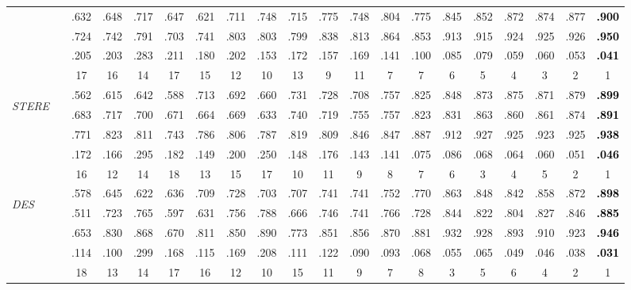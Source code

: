 \documentclass[journal]{IEEEtran}
\newcommand{\trb}[1]{\textbf{\textcolor{black}{#1}}}
\begin{document}
\begin{table*}[t!]
\begin{tabular}{lr||c|c|c|c|c|c|c|c|c|c|c||c|c|c|c|c|c|c}
&      & .632 & .648 & .717 & .647  & .621 & .711 & .748& .715 & .775  & .748 & .804 & .775 & .845 & .852  & .872  & .874 & .877 & \trb{.900}      \\
&        & .724 & .742 & .791 & .703  & .741 & .803 & .803& .799 & .838   & .813 & .864 & .853 & .913 & .915  & .924  & .925 & .926    & \trb{.950}      \\
&  & .205 & .203 & .283 & .211  & .180 & .202 & .153& .172 & .157  & .169 & .141 & .100 & .085 & .079  & .059  & .060 & .053 & \trb{.041}      \\
\toprule
&    & 17 & 16 & 14 & 17 & 15 & 12 & 10 & 13 & 9 & 11 & 7 & 7 & 6 & 5 & 4 & 3 & 2 & 1\\
    \midrule

  \multirow{4}{*}{\begin{sideways}\textit{STERE}\cite{niu2012leveraging}\end{sideways}}
    &     & .562 & .615 & .642 & .588  & .713 & .692 & .660& .731 & .728   & .708 & .757 & .825 & .848 & .873  & .875   & .871 & .879 & \trb{.899}\\
&      & .683 & .717 & .700 & .671  & .664 & .669 & .633 & .740& .719   & .755 & .757 & .823 & .831 & .863 & .860   & .861 & .874 & \trb{.891}\\
&        & .771 & .823 & .811 & .743  & .786 & .806 & .787& .819 & .809  & .846 & .847 & .887 & .912 & .927& .925  & .923 & .925 & \trb{.938}\\
&  & .172 & .166 & .295 & .182  & .149 & .200 & .250& .148 & .176  & .143 & .141 & .075 & .086 & .068  & .064   & .060 & .051 & \trb{.046}\\
\toprule
    &   & 16 & 12 & 14 & 18 & 13 & 15 & 17 & 10 & 11 & 9 & 8 & 7 & 6 & 3 & 4 & 5 & 2 & 1 \\

\midrule
  \multirow{4}{*}{\begin{sideways}\textit{DES}\cite{cheng2014depth}\end{sideways}}
    &     & .578 & .645 & .622 & .636  & .709 & .728 & .703 & .707& .741  & .741 & .752 & .770 & .863 & .848  & .842  & .858 & .872 & \trb{.898}\\
&      & .511 & .723 & .765 & .597  & .631 & .756 & .788& .666 & .746  & .741 & .766 & .728 & .844 & .822  & .804   & .827 & .846 & \trb{.885}\\
&        & .653 & .830 & .868 & .670  & .811 & .850 & .890& .773 & .851  & .856 & .870 & .881 & .932 & .928  & .893   & .910 & .923 & \trb{.946}      \\
&  & .114 & .100 & .299 & .168  & .115 & .169 & .208& .111 & .122  & .090 & .093 & .068 & .055 & .065 & .049  & .046 & .038 & \trb{.031}\\
\toprule
    &    & 18 & 13 & 14 & 17 & 16 & 12 & 10 & 15 & 11 & 9 & 7 & 8 & 3 & 5 & 6 & 4 & 2 & 1\\


\end{tabular}
\end{table*}
\end{document}
